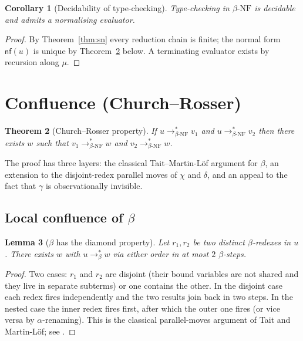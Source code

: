 \documentclass{article}
\newtheorem{theorem}{Theorem}[section]
\newtheorem{lemma}[theorem]{Lemma}
\newtheorem{corollary}[theorem]{Corollary}
\theoremstyle{definition}
\newcommand{\bnf}{\beta\text{-NF}}
\newcommand{\stepstoBeta}{\longrightarrow_{\beta}}
\newcommand{\stepstoAll}{\longrightarrow_{\bnf}}
\begin{document}
\begin{corollary}[Decidability of type-checking]
Type-checking in $\bnf$ is decidable and admits a normalising evaluator.
\end{corollary}
\begin{proof}
By Theorem~\ref{thm:sn} every reduction chain is finite; the normal form
$\mathsf{nf}(u)$ is unique by Theorem~\ref{thm:confluence} below. A
terminating evaluator exists by recursion along $\mu$.
\end{proof}

\section{Confluence (Church--Rosser)}
\label{sec:confluence}

\begin{theorem}[Church--Rosser property]
\label{thm:confluence}
If $u \stepstoAll^* v_1$ and $u \stepstoAll^* v_2$ then there exists
$w$ such that $v_1 \stepstoAll^* w$ and $v_2 \stepstoAll^* w$.
\end{theorem}

The proof has three layers: the classical Tait--Martin-L\"of argument for
$\beta$, an extension to the disjoint-redex parallel moves of $\chi$ and
$\delta$, and an appeal to the fact that $\gamma$ is observationally
invisible.

\subsection{Local confluence of $\beta$}

\begin{lemma}[$\beta$ has the diamond property]
\label{lem:beta-diamond}
Let $r_1, r_2$ be two distinct $\beta$-redexes in $u$. There exists $w$
with $u \stepstoBeta^* w$ via either order in at most $2$ $\beta$-steps.
\end{lemma}
\begin{proof}
Two cases: $r_1$ and $r_2$ are disjoint (their bound variables are not
shared and they live in separate subterms) or one contains the other. In
the disjoint case each redex fires independently and the two results join
back in two steps. In the nested case the inner redex fires first, after
which the outer one fires (or vice versa by $\alpha$-renaming). This is the
classical parallel-moves argument of Tait and Martin-L\"of; see
\cite[Chapter~3]{Barendregt1984}.
\end{proof}
\end{document}
